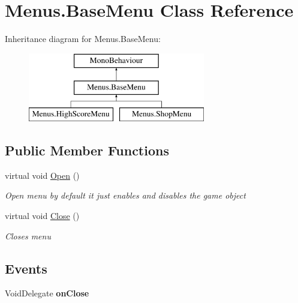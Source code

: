 \hypertarget{class_menus_1_1_base_menu}{}\section{Menus.\+Base\+Menu Class Reference}
\label{class_menus_1_1_base_menu}
Inheritance diagram for Menus.\+Base\+Menu\+:\begin{figure}[H]
\begin{center}
\leavevmode
\includegraphics[height=3.000000cm]{class_menus_1_1_base_menu}
\end{center}
\end{figure}
\subsection*{Public Member Functions}
\begin{DoxyCompactItemize}
\item 
virtual void \hyperlink{class_menus_1_1_base_menu_aedf5a0abb1c46b9687cba0f216734176}{Open} ()
\begin{DoxyCompactList}\small\item\em Open menu by default it just enables and disables the game object \end{DoxyCompactList}\item 
virtual void \hyperlink{class_menus_1_1_base_menu_a9d4fb5bab4fd1c5288774cc4e1e341af}{Close} ()
\begin{DoxyCompactList}\small\item\em Closes menu \end{DoxyCompactList}\end{DoxyCompactItemize}
\subsection*{Events}
\begin{DoxyCompactItemize}
\item 
Void\+Delegate {\bfseries on\+Close}\hypertarget{class_menus_1_1_base_menu_ab6f7e2c71bb9dc828964269ebbf93685}{}\label{class_menus_1_1_base_menu_ab6f7e2c71bb9dc828964269ebbf93685}

\end{DoxyCompactItemize}



